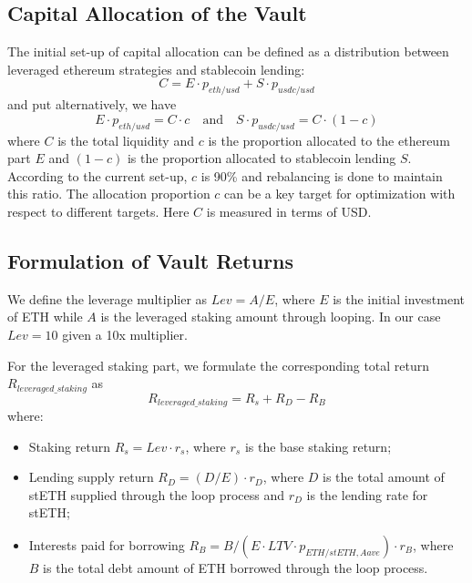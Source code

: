 \documentclass[11pt, a4paper]{article}
\begin{document}
\subsection*{Capital Allocation of the Vault}
The initial set-up of capital allocation can be defined as a distribution between leveraged ethereum strategies and stablecoin lending:
\begin{equation*}
    C = E \cdot p_{eth/usd} + S \cdot p_{usdc/usd}
\end{equation*}
and put alternatively, we have
\begin{equation*}
    E \cdot p_{eth/usd} = C \cdot c \quad \text{and} \quad S \cdot p_{usdc/usd} = C \cdot (1-c)
\end{equation*}
where $C$ is the total liquidity and $c$ is the proportion allocated to the ethereum part $E$ and $(1-c)$ is the proportion allocated to stablecoin lending $S$. According to the current set-up, $c$ is 90\% and rebalancing is done to maintain this ratio. The allocation proportion $c$ can be a key target for optimization with respect to different targets. Here $C$ is measured in terms of USD.

\subsection*{Formulation of Vault Returns}
We define the leverage multiplier as $Lev = A/E$, where $E$ is the initial investment of ETH while $A$ is the leveraged staking amount through looping. In our case $Lev = 10$ given a 10x multiplier.

For the leveraged staking part, we formulate the corresponding total return $R_{leveraged\_staking}$ as
\begin{equation*}
    R_{leveraged\_staking} = R_s + R_D - R_B
\end{equation*}
where:
\begin{itemize}
    \item Staking return $R_s = Lev \cdot r_s$, where $r_s$ is the base staking return;
    \item Lending supply return $R_D = (D/E) \cdot r_D$, where $D$ is the total amount of stETH supplied through the loop process and $r_D$ is the lending rate for stETH;
    \item Interests paid for borrowing $R_B = B / (E \cdot LTV \cdot p_{ETH/stETH,Aave}) \cdot r_B$, where $B$ is the total debt amount of ETH borrowed through the loop process.
\end{itemize}
\end{document}
